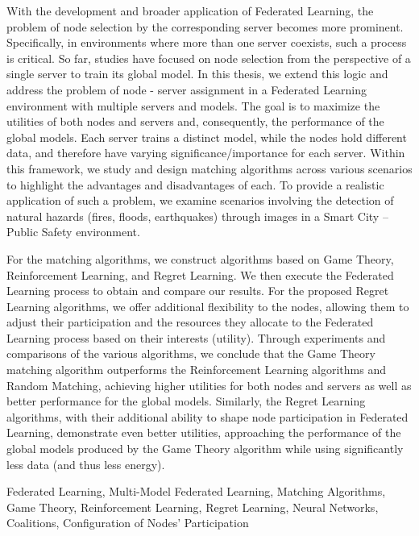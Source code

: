 \begin{abstracteng}
With the development and broader application of Federated Learning, the problem of node selection by the corresponding server becomes more prominent. Specifically, in environments where more than one server coexists, such a process is critical. So far, studies have focused on node selection from the perspective of a single server to train its global model. In this thesis, we extend this logic and address the problem of node - server assignment in a Federated Learning environment with multiple servers and models. The goal is to maximize the utilities of both nodes and servers and, consequently, the performance of the global models. Each server trains a distinct model, while the nodes hold different data, and therefore have varying significance/importance for each server. Within this framework, we study and design matching algorithms across various scenarios to highlight the advantages and disadvantages of each. To provide a realistic application of such a problem, we examine scenarios involving the detection of natural hazards (fires, floods, earthquakes) through images in a Smart City – Public Safety environment.

For the matching algorithms, we construct algorithms based on Game Theory, Reinforcement Learning, and Regret Learning. We then execute the Federated Learning process to obtain and compare our results. For the proposed Regret Learning algorithms, we offer additional flexibility to the nodes, allowing them to adjust their participation and the resources they allocate to the Federated Learning process based on their interests (utility). Through experiments and comparisons of the various algorithms, we conclude that the Game Theory matching algorithm outperforms the Reinforcement Learning algorithms and Random Matching, achieving higher utilities for both nodes and servers as well as better performance for the global models. Similarly, the Regret Learning algorithms, with their additional ability to shape node participation in Federated Learning, demonstrate even better utilities, approaching the performance of the global models produced by the Game Theory algorithm while using significantly less data (and thus less energy).

\begin{keywordseng}
    Federated Learning, Multi-Model Federated Learning, Matching Algorithms, Game Theory, Reinforcement Learning, Regret Learning, Neural Networks, Coalitions, Configuration of Nodes' Participation
\end{keywordseng}
\end{abstracteng}


